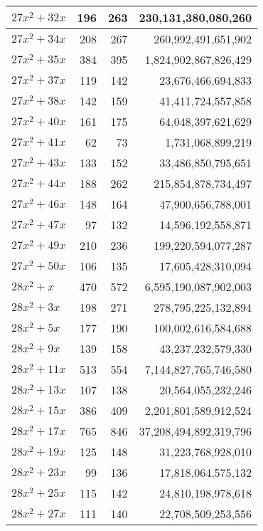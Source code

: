 \documentclass[a4paper]{amsproc}
\theoremstyle{plain}
\begin{document}
\begin{longtable}{ | l | r | r | r | }
$27x^2 + 32x$ & 196 & 263 & 230{,}131{,}380{,}080{,}260 \\ \hline
$27x^2 + 34x$ & 208 & 267 & 260{,}992{,}491{,}651{,}902 \\ \hline
$27x^2 + 35x$ & 384 & 395 & 1{,}824{,}902{,}867{,}826{,}429 \\ \hline
$27x^2 + 37x$ & 119 & 142 & 23{,}676{,}466{,}694{,}833 \\ \hline
$27x^2 + 38x$ & 142 & 159 & 41{,}411{,}724{,}557{,}858 \\ \hline
$27x^2 + 40x$ & 161 & 175 & 64{,}048{,}397{,}621{,}629 \\ \hline
$27x^2 + 41x$ & 62 & 73 & 1{,}731{,}068{,}899{,}219 \\ \hline
$27x^2 + 43x$ & 133 & 152 & 33{,}486{,}850{,}795{,}651 \\ \hline
$27x^2 + 44x$ & 188 & 262 & 215{,}854{,}878{,}734{,}497 \\ \hline
$27x^2 + 46x$ & 148 & 164 & 47{,}900{,}656{,}788{,}001 \\ \hline
$27x^2 + 47x$ & 97 & 132 & 14{,}596{,}192{,}558{,}871 \\ \hline
$27x^2 + 49x$ & 210 & 236 & 199{,}220{,}594{,}077{,}287 \\ \hline
$27x^2 + 50x$ & 106 & 135 & 17{,}605{,}428{,}310{,}094 \\ \hline
$28x^2 + x$ & 470 & 572 & 6{,}595{,}190{,}087{,}902{,}003 \\ \hline
$28x^2 + 3x$ & 198 & 271 & 278{,}795{,}225{,}132{,}894 \\ \hline
$28x^2 + 5x$ & 177 & 190 & 100{,}002{,}616{,}584{,}688 \\ \hline
$28x^2 + 9x$ & 139 & 158 & 43{,}237{,}232{,}579{,}330 \\ \hline
$28x^2 + 11x$ & 513 & 554 & 7{,}144{,}827{,}765{,}746{,}580 \\ \hline
$28x^2 + 13x$ & 107 & 138 & 20{,}564{,}055{,}232{,}246 \\ \hline
$28x^2 + 15x$ & 386 & 409 & 2{,}201{,}801{,}589{,}912{,}524 \\ \hline
$28x^2 + 17x$ & 765 & 846 & 37{,}208{,}494{,}892{,}319{,}796 \\ \hline
$28x^2 + 19x$ & 125 & 148 & 31{,}223{,}768{,}928{,}010 \\ \hline
$28x^2 + 23x$ & 99 & 136 & 17{,}818{,}064{,}575{,}132 \\ \hline
$28x^2 + 25x$ & 115 & 142 & 24{,}810{,}198{,}978{,}618 \\ \hline
$28x^2 + 27x$ & 111 & 140 & 22{,}708{,}509{,}253{,}556 \\ \hline

\end{longtable}
\end{document}
